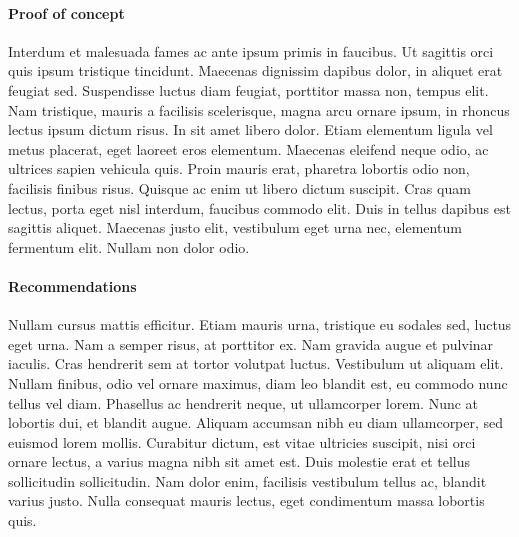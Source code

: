 \paragraph{Proof of concept}
Interdum et malesuada fames ac ante ipsum primis in faucibus. Ut sagittis orci quis ipsum tristique tincidunt. Maecenas dignissim dapibus dolor, in aliquet erat feugiat sed. Suspendisse luctus diam feugiat, porttitor massa non, tempus elit. Nam tristique, mauris a facilisis scelerisque, magna arcu ornare ipsum, in rhoncus lectus ipsum dictum risus. In sit amet libero dolor. Etiam elementum ligula vel metus placerat, eget laoreet eros elementum. Maecenas eleifend neque odio, ac ultrices sapien vehicula quis. Proin mauris erat, pharetra lobortis odio non, facilisis finibus risus. Quisque ac enim ut libero dictum suscipit. Cras quam lectus, porta eget nisl interdum, faucibus commodo elit. Duis in tellus dapibus est sagittis aliquet. Maecenas justo elit, vestibulum eget urna nec, elementum fermentum elit. Nullam non dolor odio.

\paragraph{Recommendations}
Nullam cursus mattis efficitur. Etiam mauris urna, tristique eu sodales sed, luctus eget urna. Nam a semper risus, at porttitor ex. Nam gravida augue et pulvinar iaculis. Cras hendrerit sem at tortor volutpat luctus. Vestibulum ut aliquam elit. Nullam finibus, odio vel ornare maximus, diam leo blandit est, eu commodo nunc tellus vel diam. Phasellus ac hendrerit neque, ut ullamcorper lorem. Nunc at lobortis dui, et blandit augue. Aliquam accumsan nibh eu diam ullamcorper, sed euismod lorem mollis. Curabitur dictum, est vitae ultricies suscipit, nisi orci ornare lectus, a varius magna nibh sit amet est. Duis molestie erat et tellus sollicitudin sollicitudin. Nam dolor enim, facilisis vestibulum tellus ac, blandit varius justo. Nulla consequat mauris lectus, eget condimentum massa lobortis quis. 

\pagebreak


